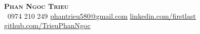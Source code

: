 \begin{center}
    \textbf{\Huge \scshape Phan Ngoc Trieu} \\ \vspace{1pt}
     \ \small 0974 210 249 \quad
    \href{mailto:firstlast@gmail.com}{ \underline{phantrieu580@gmail.com}} \quad
    \href{https://www.linkedin.com/in/trieu-phan-5688b715b/}{ \underline{linkedin.com/firstlast}} \quad
    \href{https://github.com/PhanNgocTrieu}{ \underline{github.com/TrieuPhanNgoc}}
\end{center}